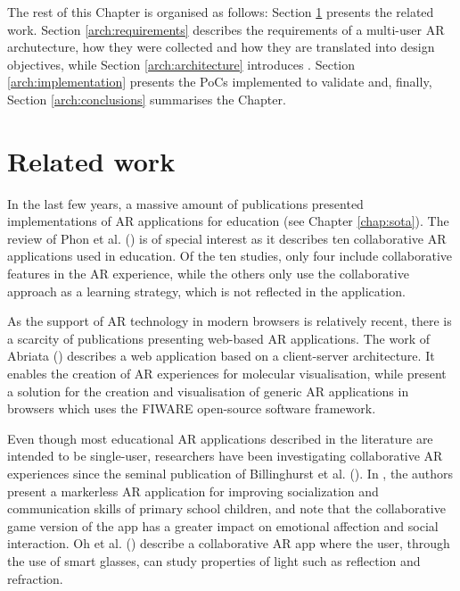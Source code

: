 The rest of this Chapter is organised as follows: Section \ref{arch:related} presents the related work. Section \ref{arch:requirements} describes the requirements of a multi-user AR archutecture, how they were collected and how they are translated into design objectives, while Section \ref{arch:architecture} introduces \arch{}. Section \ref{arch:implementation} presents the PoCs implemented to validate \arch{} and, finally, Section \ref{arch:conclusions} summarises the Chapter.


\section{Related work}\label{arch:related}

In the last few years, a massive amount of publications presented implementations of AR applications for education (see Chapter \ref{chap:sota}). The review of Phon et al. (\citeyear{6821833}) is of special interest as it describes ten collaborative AR applications used in education. Of the ten studies, only four include collaborative features in the AR experience, while the others only use the collaborative approach as a learning strategy, which is not reflected in the application.

As the support of AR technology in modern browsers is relatively recent, there is a scarcity of publications presenting web-based AR applications. 
The work of Abriata (\citeyear{abriata2020building}) describes a web application based on a client-server architecture. It enables the creation of AR experiences for molecular visualisation, while \cite{coma2019fi} present a solution for the creation and visualisation of generic AR applications in browsers which uses the FIWARE open-source software framework.

Even though most educational AR applications described in the literature are intended to be single-user, researchers have been investigating collaborative AR experiences since the seminal publication of Billinghurst et al. (\citeyear{billinghurst2002collaborative}). In \cite{lopez2020emofindar}, the authors present a markerless AR application for improving socialization and communication skills of primary school children, and note that the collaborative game version of the app has a greater impact on emotional affection and social interaction. Oh et al. (\citeyear{oh2017hybrid}) describe a collaborative AR app where the user, through the use of smart glasses, can study properties of light such as reflection and refraction.

